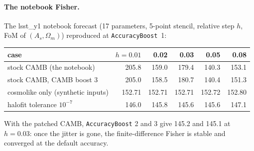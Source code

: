 \documentclass[11pt]{article}
\begin{document}
\paragraph{The notebook Fisher.} The lsst\_y1 notebook forecast (17
parameters, 5-point stencil, relative step $h$, FoM of $(A_s,\Omega_m)$)
reproduced at \texttt{AccuracyBoost}~1:
\begin{center}\small
\begin{tabular}{lrrrrr}
\toprule
case & $h=0.01$ & 0.02 & 0.03 & 0.05 & 0.08\\
\midrule
stock CAMB (the notebook) & 205.8 & 159.0 & 179.4 & 140.3 & 153.1\\
stock CAMB, CAMB boost 3 & 205.0 & 158.5 & 180.7 & 140.4 & 151.3\\
cosmolike only (synthetic inputs) & 152.71 & 152.71 & 152.71 & 152.72 & 152.80\\
halofit tolerance $10^{-7}$ & 146.0 & 145.8 & 145.6 & 145.6 & 147.1\\
\bottomrule
\end{tabular}
\end{center}
With the patched CAMB, \texttt{AccuracyBoost} 2 and 3 give 145.2 and 145.1
at $h=0.03$: once the jitter is gone, the finite-difference Fisher is
stable and converged at the default accuracy.
\end{document}
